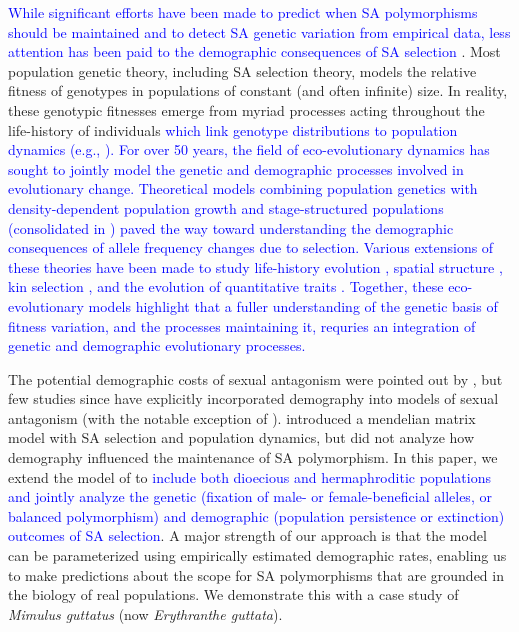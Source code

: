 \documentclass[11pt]{article}
\begin{document}
\textcolor{blue}{While significant efforts have been made to predict when SA polymorphisms should be maintained and to detect SA genetic variation from empirical data, less attention has been paid to the demographic consequences of SA selection \citep{MatthewsConnallon2019}}. Most population genetic theory, including SA selection theory, models the relative fitness of genotypes in populations of constant (and often infinite) size. In reality, these genotypic fitnesses emerge from myriad processes acting throughout the life-history of individuals \textcolor{blue}{which link genotype distributions to population dynamics (e.g., \citealt {johnston2013life, merot2020balancing}). For over 50 years, the field of eco-evolutionary dynamics has sought to jointly model the genetic and demographic processes involved in evolutionary change. Theoretical models combining population genetics with density-dependent population growth \citep{roughgarden1971density} and stage-structured populations (consolidated in \citealt{Charlesworth_1994}) paved the way toward understanding the demographic consequences of allele frequency changes due to selection. Various extensions of these theories have been made to study life-history evolution \citep{orive1995senescence, orive2001somatic}, spatial structure \citep{ronce2000kin}, kin selection \citep{rousset2004genetic}, and the evolution of quantitative traits \citep[e.g.,][]{coulson2006putting, barfield2011evolution, childs2016evolution, orive2017effects}. Together, these eco-evolutionary models highlight that a fuller understanding of the genetic basis of fitness variation, and the processes maintaining it, requries an integration of genetic and demographic evolutionary processes.}


The potential demographic costs of sexual antagonism were pointed out by \cite{kokko2003sexy}, but few studies since have explicitly incorporated demography into models of sexual antagonism (with the notable exception of \citealt{harts2014demography}). \citet{deVriesCaswell2019a} introduced a mendelian matrix model with SA selection and population dynamics, but did not analyze how demography influenced the maintenance of SA polymorphism. In this paper, we extend the model of \citet{deVriesCaswell2019a,deVriesCaswell2019b} to \textcolor{blue}{include both dioecious and hermaphroditic populations and jointly analyze the genetic (fixation of male- or female-beneficial alleles, or balanced polymorphism) and demographic (population persistence or extinction) outcomes of SA selection}. A major strength of our approach is that the model can be parameterized using empirically estimated demographic rates, enabling us to make predictions about the scope for SA polymorphisms that are grounded in the biology of real populations. We demonstrate this with a case study of {\itshape Mimulus guttatus} (now {\itshape Erythranthe guttata}).
\end{document}
